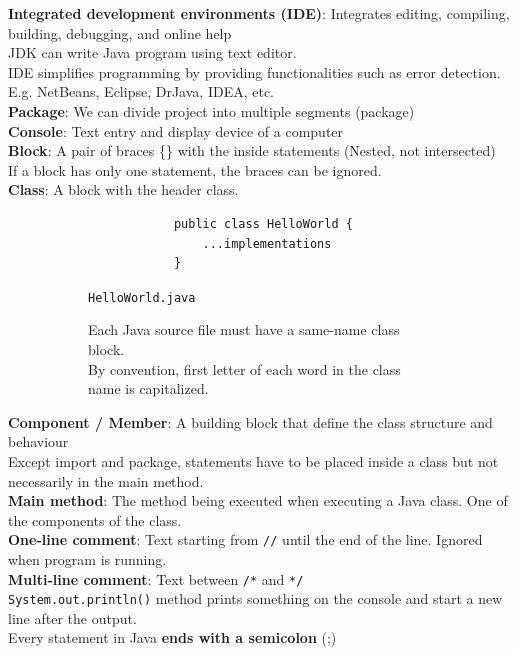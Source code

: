 \documentclass{article}
\begin{document}
\textbf{Integrated development environments (IDE)}: Integrates editing, compiling, building, debugging, and online help\\
JDK can write Java program using text editor.\\
IDE simplifies programming by providing functionalities such as error detection. E.g. NetBeans, Eclipse, DrJava, IDEA, etc.\\
\textbf{Package}: We can divide project into multiple segments (package)\\
\textbf{Console}: Text entry and display device of a computer\\
\textbf{Block}: A pair of braces \{\} with the inside statements (Nested, not intersected)\\
If a block has only one statement, the braces can be ignored.\\
\textbf{Class}: A block with the header class.

\begin{figure}[h]
	\centering
	\begin{subfigure}[h]{.3\textwidth}
		\begin{verbatim}
			public class HelloWorld {
			    ...implementations
			}
		\end{verbatim}
		\caption{\texttt{HelloWorld.java}}
	\end{subfigure}
	\begin{subfigure}[h]{.6\textwidth}
		Each Java source file must have a same-name class block.\\
		By convention, first letter of each word in the class name is capitalized.
	\end{subfigure}
\end{figure}
\newpage

\textbf{Component / Member}: A building block that define the class structure and behaviour\\
Except import and package, statements have to be placed inside a class but not necessarily in the main method.\\
\textbf{Main method}: The method being executed when executing a Java class. One of the components of the class.\\
\textbf{One-line comment}: Text starting from \texttt{//} until the end of the line. Ignored when program is running.\\
\textbf{Multi-line comment}: Text between \texttt{/*} and \texttt{*/}\\
\texttt{System.out.println()} method prints something on the console and start a new line after the output.\\
Every statement in Java \textbf{ends with a semicolon} (;)
\end{document}
